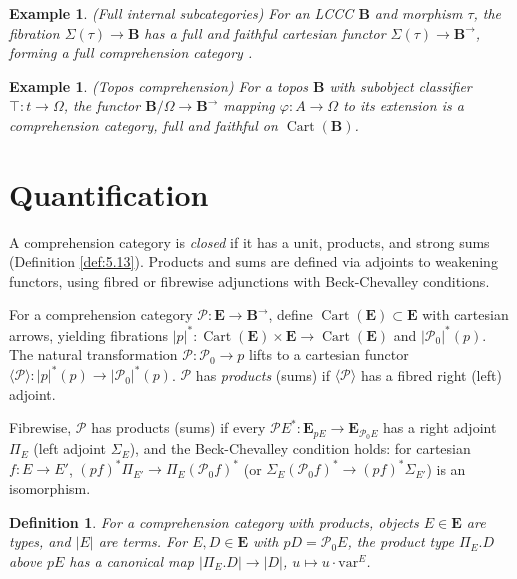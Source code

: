 \documentclass{article}
\theoremstyle{plain}
\newtheorem{definition}[theorem]{Definition}
\newtheorem{example}[theorem]{Example}
\theoremstyle{remark}
\begin{document}
\begin{example}
\label{ex:4.6}
(Full internal subcategories) For an LCCC $\mathbf{B}$ and morphism $\tau$, the fibration $\Sigma(\tau) \to \mathbf{B}$ has a full and faithful cartesian functor $\Sigma(\tau) \to \mathbf{B}^{\to}$, forming a full comprehension category \cite{Pitts1987, Johnstone1977}.
\end{example}

\begin{example}
\label{ex:4.7}
(Topos comprehension) For a topos $\mathbf{B}$ with subobject classifier $\top : t \to \Omega$, the functor $\mathbf{B}/\Omega \to \mathbf{B}^{\to}$ mapping $\varphi : A \to \Omega$ to its extension is a comprehension category, full and faithful on $\operatorname{Cart}(\mathbf{B})$.
\end{example}

\newpage
\section{Quantification}
\label{sec:quantification}

A comprehension category is \emph{closed} if it has a unit, products, and strong sums (Definition \ref{def:5.13}). Products and sums are defined via adjoints to weakening functors, using fibred or fibrewise adjunctions with Beck-Chevalley conditions.

For a comprehension category $\mathscr{P} : \mathbf{E} \to \mathbf{B}^{\to}$, define $\operatorname{Cart}(\mathbf{E}) \subset \mathbf{E}$ with cartesian arrows, yielding fibrations $|p|^* : \operatorname{Cart}(\mathbf{E}) \times \mathbf{E} \to \operatorname{Cart}(\mathbf{E})$ and $|\mathscr{P}_0|^*(p)$. The natural transformation $\mathscr{P} : \mathscr{P}_0 \to p$ lifts to a cartesian functor $\langle \mathscr{P} \rangle : |p|^*(p) \to |\mathscr{P}_0|^*(p)$. $\mathscr{P}$ has \emph{products} (sums) if $\langle \mathscr{P} \rangle$ has a fibred right (left) adjoint.

Fibrewise, $\mathscr{P}$ has products (sums) if every $\mathscr{P} E^* : \mathbf{E}_{p E} \to \mathbf{E}_{\mathscr{P}_0 E}$ has a right adjoint $\Pi_E$ (left adjoint $\Sigma_E$), and the Beck-Chevalley condition holds: for cartesian $f : E \to E'$, $(p f)^* \Pi_{E'} \to \Pi_E (\mathscr{P}_0 f)^*$ (or $\Sigma_E (\mathscr{P}_0 f)^* \to (p f)^* \Sigma_{E'}$) is an isomorphism.

\begin{definition}
\label{def:5.1}
For a comprehension category with products, objects $E \in \mathbf{E}$ are \emph{types}, and $|E|$ are \emph{terms}. For $E, D \in \mathbf{E}$ with $p D = \mathscr{P}_0 E$, the product type $\Pi_E . D$ above $p E$ has a canonical map $|\Pi_E . D| \to |D|$, $u \mapsto u \cdot \text{var}^E$.
\end{definition}
\end{document}
